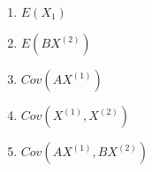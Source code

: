 \documentclass[12pt,a4paper]{paper}
\begin{document}
\begin{enumerate}
\begin{enumerate}
\item $E(X_{1})$
\item $E(BX^{(2)})$
\item $Cov(AX^{(1)})$
\item $Cov(X^{(1)},X^{(2)})$
\item $Cov(AX^{(1)},BX^{(2)})$
\end{enumerate}
\end{enumerate}
\end{document}
